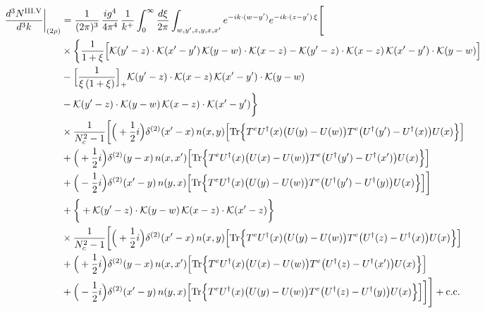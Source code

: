 \documentclass[9pt]{article}
\numberwithin{equation}{section}
\begin{document}
\begin{align}
\frac{d^{3}N^{\rm III.V}}{d^{3}k}\bigg|_{(2\rho)}&=\frac{1}{(2\pi)^{3}}\,\frac{ig^{4}}{4\pi^{4}}\,\frac{1}{k^{+}}\int_{0}^{\infty}\frac{d\xi}{2\pi}\int_{w,y',z,y,x,x'}e^{-ik\cdot(w-y')}e^{-ik\cdot(z-y')\,\xi}\Bigg[\notag\\
&\times\bigg\{\frac{1}{1+\xi}\Big[\mathcal{K}(y'-z)\cdot\mathcal{K}(x'-y')\,\mathcal{K}(y-w)\cdot\mathcal{K}(x-z)-\mathcal{K}(y'-z)\cdot\mathcal{K}(x-z)\,\mathcal{K}(x'-y')\cdot\mathcal{K}(y-w)\Big]\notag\\
&-\Big[\frac{1}{\xi\,(1+\xi)}\Big]_{+}\mathcal{K}(y'-z)\cdot\mathcal{K}(x-z)\,\mathcal{K}(x'-y')\cdot\mathcal{K}(y-w)\notag\\
&-\mathcal{K}(y'-z)\cdot\mathcal{K}(y-w)\,\mathcal{K}(x-z)\cdot\mathcal{K}(x'-y')\bigg\}\notag\\
&\times \frac{1}{N_{c}^{2}-1}\bigg[\Big(+\frac{1}{2}i\Big)\delta^{(2)}(x'-x)\,n(x,y)\Big[{\rm Tr}\Big\{T^{e}U^{\dagger}(x)\big(U(y)-U(w)\big)T^{e}\big(U^{\dagger}(y')-U^{\dagger}(x)\big)U(x)\Big\}\Big]\notag\\
& +\Big(+\frac{1}{2}i\Big)\delta^{(2)}(y-x)\,n(x,x')\Big[{\rm Tr}\Big\{T^{e}U^{\dagger}(x)\big(U(x)-U(w)\big)T^{e}\big(U^{\dagger}(y')-U^{\dagger}(x')\big)U(x)\Big\}\Big]\notag\\
& +\Big(-\frac{1}{2}i\Big)\delta^{(2)}(x'-y)\,n(y,x)\Big[{\rm Tr}\Big\{T^{e}U^{\dagger}(x)\big(U(y)-U(w)\big)T^{e}\big(U^{\dagger}(y')-U^{\dagger}(y)\big)U(x)\Big\}\Big]\bigg]\notag\\
&+\bigg\{+\mathcal{K}(y'-z)\cdot\mathcal{K}(y-w)\,\mathcal{K}(x-z)\cdot\mathcal{K}(x'-z)\bigg\}\notag\\
&\times \frac{1}{N_{c}^{2}-1}\bigg[\Big(+\frac{1}{2}i\Big)\delta^{(2)}(x'-x)\,n(x,y)\Big[{\rm Tr}\Big\{T^{e}U^{\dagger}(x)\big(U(y)-U(w)\big)T^{e}\big(U^{\dagger}(z)-U^{\dagger}(x)\big)U(x)\Big\}\Big]\notag\\
& +\Big(+\frac{1}{2}i\Big)\delta^{(2)}(y-x)\,n(x,x')\Big[{\rm Tr}\Big\{T^{e}U^{\dagger}(x)\big(U(x)-U(w)\big)T^{e}\big(U^{\dagger}(z)-U^{\dagger}(x')\big)U(x)\Big\}\Big]\notag\\
& +\Big(-\frac{1}{2}i\Big)\delta^{(2)}(x'-y)\,n(y,x)\Big[{\rm Tr}\Big\{T^{e}U^{\dagger}(x)\big(U(y)-U(w)\big)T^{e}\big(U^{\dagger}(z)-U^{\dagger}(y)\big)U(x)\Big\}\Big]\bigg]\Bigg]+{\rm c.c.}\label{eq:S-III.V-2}
\end{align}
\end{document}
